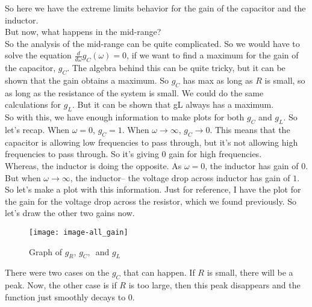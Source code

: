 So here we have the extreme limits behavior for the gain of the capacitor and the inductor.\\

But now, what happens in the mid-range?\\
So the analysis of the mid-range can be quite complicated.
So we would have to solve the equation $\frac{d}{d \omega} g_C(\omega) = 0$, 
if we want to find a maximum for the gain of the capacitor, $g _C$.
The algebra behind this can be quite tricky,
but it can be shown that the gain obtains a maximum.
So $g_ C$ has max as long as $R$ is small,
so as long as the resistance of the system is small.
We could do the same calculations for $g _L$.
But it can be shown that gL always has a maximum. \\

So with this, we have enough information
to make plots for both $g _C$ and $g _L$.
So let's recap.
When $\omega = 0$, $g _C =  1$.
When $\omega \to \infty$, $g_C \to 0$.
This means that the capacitor is allowing low frequencies
to pass through, but it's not allowing high frequencies
to pass through.
So it's giving $0$ gain for high frequencies.\\
Whereas, the inductor is doing the opposite.
As $\omega =  0$, the inductor has gain of $0$.
But when $\omega \to \infty$, the inductor--
the voltage drop across inductor has gain of $1$.
So let's make a plot with this information.
Just for reference, I have the plot for the gain for the voltage drop
across the resistor, which we found previously.
So let's draw the other two gains now.

\begin{figure}[ht!]
  \centering
  \texttt{[image: image-all\_gain]}
  \caption{Graph of $g _R, \, g _C, \,$ and $g _L$}
\end{figure}

There were two cases on the $g _C$ that can happen.
If $R$ is small, there will be a peak.
Now, the other case is if $R$ is too large,
then this peak disappears and the function just
smoothly decays to $0$. \\


